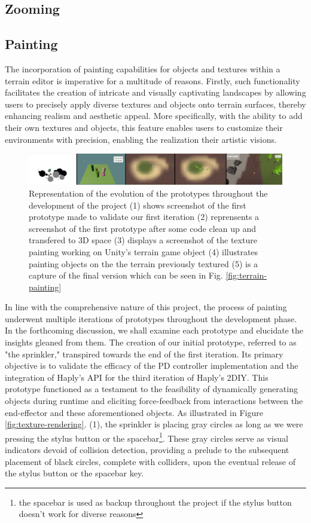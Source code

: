\subsection{Zooming}


\subsection{Painting}
The incorporation of painting capabilities for objects and textures within a terrain editor is imperative for a multitude of reasons. 
Firstly, such functionality facilitates the creation of intricate and visually captivating landscapes by allowing users to precisely apply diverse textures and objects onto terrain surfaces, thereby enhancing realism and aesthetic appeal. 
More specifically, with the ability to add their own textures and objects, this feature enables users to customize their environments with precision, enabling the realization their artistic visions. 

\begin{figure}[htbp]
    \centering
    \includegraphics[width=1.0\textwidth]{images/timeline.png} 
    \caption{Representation of the evolution of the prototypes throughout the development of the project
    (1) shows screenshot of the first prototype made to validate our first iteration
    (2) reprensents a screenshot of the first prototype after some code clean up and transfered to 3D space
    (3) displays a screenshot of the texture painting working on Unity's terrain game object
    (4) illustrates painting objects on the the terrain previously textured
    (5) is a capture of the final version which can be seen in Fig. \ref{fig:terrain-painting}}
    \label{fig:evolution-painting}
\end{figure}

In line with the comprehensive nature of this project, the process of painting underwent multiple iterations of prototypes throughout the development phase. 
In the forthcoming discussion, we shall examine each prototype and elucidate the insights gleaned from them. 
The creation of our initial prototype, referred to as "the sprinkler," transpired towards the end of the first iteration. 
Its primary objective is to validate the efficacy of the PD controller implementation and the integration of Haply's API for the third iteration of Haply's 2DIY. 
This prototype functioned as a testament to the feasibility of dynamically generating objects during runtime and eliciting force-feedback from interactions between the end-effector and these aforementioned objects.
As illustrated in Figure \ref{fig:texture-rendering}. (1), the sprinkler is placing gray circles as long as we were pressing the stylus button or the spacebar\footnote{the spacebar is used as backup throughout the project if the stylus button doesn't work for diverse reasons}.
These gray circles serve as visual indicators devoid of collision detection, providing a prelude to the subsequent placement of black circles, complete with colliders, upon the eventual release of the stylus button or the spacebar key.



